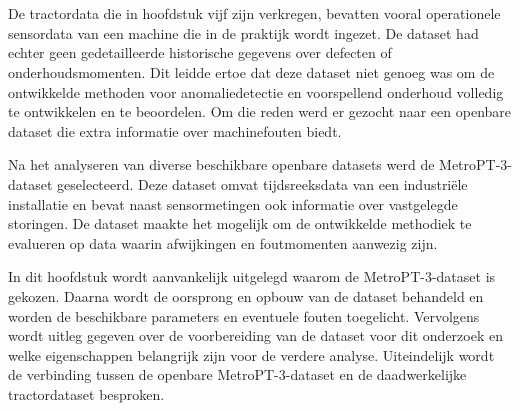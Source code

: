 
\chapter{}%
\label{ch:de openbare data}

De tractordata die in hoofdstuk vijf zijn verkregen, bevatten vooral operationele sensordata van een machine die in de praktijk wordt ingezet. De dataset had echter geen gedetailleerde historische gegevens over defecten of onderhoudsmomenten. Dit leidde ertoe dat deze dataset niet genoeg was om de ontwikkelde methoden voor anomaliedetectie en voorspellend onderhoud volledig te ontwikkelen en te beoordelen. Om die reden werd er gezocht naar een openbare dataset die extra informatie over machinefouten biedt.

Na het analyseren van diverse beschikbare openbare datasets werd de MetroPT-3-dataset geselecteerd. Deze dataset omvat tijdsreeksdata van een industriële installatie en bevat naast sensormetingen ook informatie over vastgelegde storingen. De dataset maakte het mogelijk om de ontwikkelde methodiek te evalueren op data waarin afwijkingen en foutmomenten aanwezig zijn.

In dit hoofdstuk wordt aanvankelijk uitgelegd waarom de MetroPT-3-dataset is gekozen. Daarna wordt de oorsprong en opbouw van de dataset behandeld en worden de beschikbare parameters en eventuele fouten toegelicht. Vervolgens wordt uitleg gegeven over de voorbereiding van de dataset voor dit onderzoek en welke eigenschappen belangrijk zijn voor de verdere analyse. Uiteindelijk wordt de verbinding tussen de openbare MetroPT-3-dataset en de daadwerkelijke tractordataset besproken.



